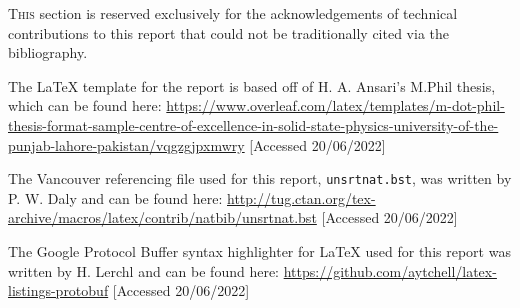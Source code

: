 \lettrine{T}{his} section is reserved exclusively for the acknowledgements of technical contributions to this report
that could not be traditionally cited via the bibliography.

The LaTeX template for the report is based off of H. A. Ansari's M.Phil thesis, which can be found here:
\url{https://www.overleaf.com/latex/templates/m-dot-phil-thesis-format-sample-centre-of-excellence-in-solid-state-physics-university-of-the-punjab-lahore-pakistan/vqgzgjpxmwry}
[Accessed 20/06/2022]

The Vancouver referencing file used for this report, \texttt{unsrtnat.bst}, was written by P. W. Daly and can be
found here: \url{http://tug.ctan.org/tex-archive/macros/latex/contrib/natbib/unsrtnat.bst} [Accessed 20/06/2022]

The Google Protocol Buffer syntax highlighter for LaTeX used for this report was written by H. Lerchl and can be
found here: \url{https://github.com/aytchell/latex-listings-protobuf} [Accessed 20/06/2022]
